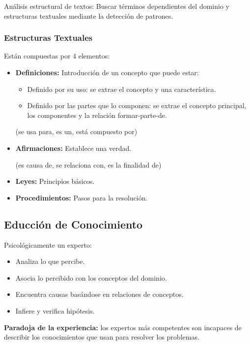 \documentclass[12pt, twoside, openright]{report} %
\begin{document}
Análisis estructural de textos: Buscar términos dependientes del dominio y estructuras textuales mediante la detección de patrones.

\subsubsection{Estructuras Textuales}
Están compuestas por 4 elementos:
\begin{itemize}
	\item \textbf{Definiciones:} Introducción de un concepto que puede estar:
	      \begin{itemize}
		      \item Definido por su uso: se extrae el concepto y una característica.
		      \item Definido por las partes que lo componen: se extrae el concepto
		            principal, los componentes y la relación formar-parte-de.
	      \end{itemize}
	      (se usa para, es un, está compuesto por)
	\item \textbf{Afirmaciones:} Establece una verdad.
	      
	      (es causa de, se relaciona con, es la finalidad de)
	\item \textbf{Leyes:} Principios básicos.
	\item \textbf{Procedimientos:} Pasos para la resolución.
\end{itemize}

\subsection{Educción de Conocimiento}
Psicológicamente un experto:
\begin{itemize}
	\item Analiza lo que percibe.
	\item Asocia lo percibido con los conceptos del dominio.
	\item Encuentra causas basándose en relaciones de conceptos.
	\item Infiere y verifica hipótesis.
\end{itemize}

\textbf{Paradoja de la experiencia:} los expertos más competentes son incapaces de describir los conocimientos que usan para resolver los problemas.
\end{document}
